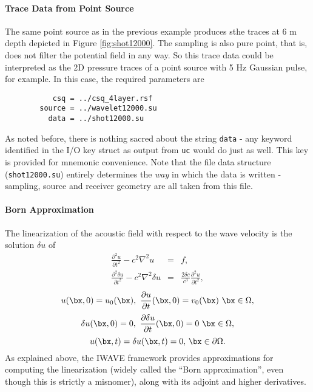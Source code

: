 \noindent \paragraph{Trace Data from Point Source}
The same point source as in the previous example produces sthe traces
at 6 m depth depicted in Figure \ref{fig:shot12000}. The sampling is
also pure point, that is, does not filter the potential field in any
way. So this trace data could be interpreted as the 2D pressure
traces of a point source with 5 Hz Gaussian pulse, for example.
In this case, the required parameters are
\begin{verbatim}
           csq = ../csq_4layer.rsf
        source = ../wavelet12000.su
          data = ../shot12000.su
\end{verbatim}
As noted before, there is nothing sacred about the string {\tt data} -
any keyword identified in the I/O key struct as output from {\tt uc}
would do just as well. This key is provided for mnemonic convenience.
Note that the file data structure ({\tt shot12000.su}) entirely
determines the  {\em way} in which the data is written - sampling,
source and receiver geometry are all taken from this file.


\noindent \paragraph{Born Approximation}
The linearization of the acoustic field with respect to the wave
velocity is the solution $\delta u$ of
\begin{eqnarray}
\frac{\partial^2 u}{\partial t^2} - c^2 \nabla^2 u & = & f,\\
\frac{\partial^2 \delta u}{\partial t^2} - c^2 \nabla^2 \delta u & = &
\frac{2\delta c}{c^3}\frac{\partial^2 u}{\partial t^2},
\end{eqnarray}
\[
u(\bx,0) = u_0(\bx),\,\,\frac{\partial u}{\partial t}(\bx,0) =
v_0(\bx)\,\, \bx \in \Omega,
\]
\[
\delta u(\bx,0) = 0,\,\,\frac{\partial \delta u}{\partial t}(\bx,0) =
0\,\, \bx \in \Omega,
\]
\[
u(\bx,t) = \delta u(\bx,t) = 0, \,\bx \in \partial \Omega.
\]
As explained above, the IWAVE framework provides approximations for
computing the linearization (widely called the ``Born approximation'',
even though this is strictly a misnomer), along with its adjoint and
higher derivatives. 

